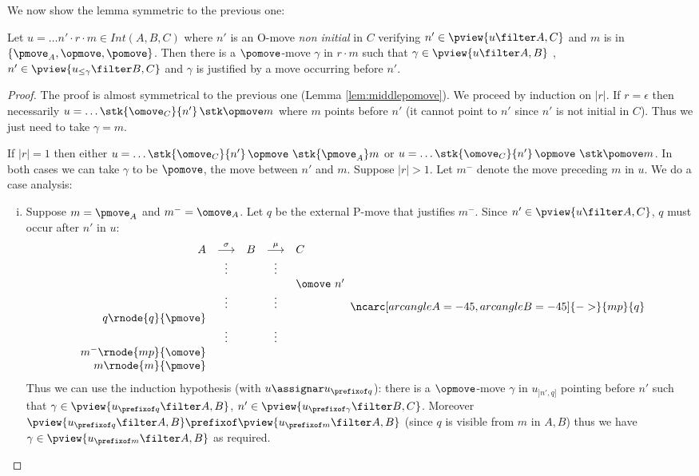 We now show the lemma symmetric to the previous one:
\begin{lemma}
\label{lem:middleopmove}
Let $u = \ldots n' \cdot r \cdot m \in Int(A,B,C)$ where
$n'$ is an O-move \emph{non initial} in $C$ verifying $n' \in \pview{u\filter A,C}$ and $m$ is in $\{\pmove_A, \opmove, \pomove\}$. Then there is a $\pomove$-move $\gamma$ in $r \cdot m$ such that $\gamma \in \pview{u\filter A,B}$ , $n' \in \pview{u_{\leq \gamma} \filter B,C}$ and $\gamma$ is justified by a move occurring before $n'$.
\end{lemma}
\begin{proof}
The proof is almost symmetrical to the previous one (Lemma \ref{lem:middlepomove}). We proceed by induction on $|r|$.
If $r=\epsilon$ then necessarily $u = \ldots \stk {\omove_C} {n'} \thinspace\stk \opmove m$ where $m$ points before $n'$ (it cannot point to $n'$
since $n'$ is not initial in $C$). Thus we just need to take $\gamma = m$.

If $|r|=1$ then either
$u = \ldots \stk {\omove_C} {n'} \thinspace\opmove\thinspace\thinspace\stk{\pmove_A} m$
or $u = \ldots \stk {\omove_C} {n'} \thinspace\opmove\thinspace\thinspace\stk \pomove m$.
In both cases we can take $\gamma$ to be $\pomove$, the move between $n'$ and $m$.
Suppose $|r|>1$. Let $m^-$ denote the move preceding $m$ in $u$.
We do a case analysis:
\begin{enumerate}[i.]
\item Suppose $m = \pmove_A$ and $m^- = \omove_A$.
Let $q$ be the external P-move that justifies $m^-$.
Since $n' \in \pview{u\filter A,C}$, $q$ must occur after $n'$ in $u$:
$$
\begin{array}{rcccl}
A & \stackrel\sigma{\longrightarrow} & B & \stackrel\mu{\longrightarrow} & C \\
&\vdots&&\vdots\\
&&&& \omove\ n'\\
&\vdots&&\vdots  \\
q\rnode{q}{\pmove}  \\
&\vdots&&\vdots  \\
m^- \rnode{mp}{\omove}  \\
m \rnode{m}{\pmove}  \\
\end{array}
\ncarc[arcangleA=-45,arcangleB=-45]{->}{mp}{q}
 $$
Thus we can use the induction hypothesis (with $u\assignar u_{\prefixof q}$): there is a $\opmove$-move $\gamma$
in $u_{]n',q]}$ pointing before $n'$ such that $\gamma \in \pview{u_{\prefixof q} \filter A,B}$, $n' \in \pview{u_{\prefixof \gamma} \filter B,C}$.
Moreover $\pview{u_{\prefixof q} \filter A,B} \prefixof \pview{u_{\prefixof m} \filter A,B}$ (since $q$ is visible from $m$ in $A,B$) thus we have $\gamma \in \pview{u_{\prefixof m} \filter A,B}$ as required.


\end{enumerate}
\end{proof}

